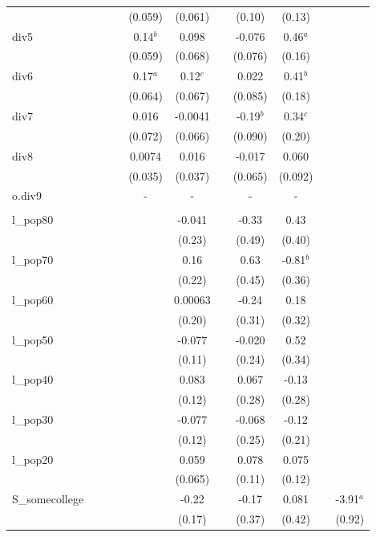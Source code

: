 \documentclass[]{article}
\begin{document}
\begin{tabular}{lcccccccccc}
 &  &  &  & (0.059) & (0.061) &  & (0.10) & (0.13) &  &  \\
div5 &  &  &  & 0.14$^b$ & 0.098 &  & -0.076 & 0.46$^a$ &  &  \\
 &  &  &  & (0.059) & (0.068) &  & (0.076) & (0.16) &  &  \\
div6 &  &  &  & 0.17$^a$ & 0.12$^c$ &  & 0.022 & 0.41$^b$ &  &  \\
 &  &  &  & (0.064) & (0.067) &  & (0.085) & (0.18) &  &  \\
div7 &  &  &  & 0.016 & -0.0041 &  & -0.19$^b$ & 0.34$^c$ &  &  \\
 &  &  &  & (0.072) & (0.066) &  & (0.090) & (0.20) &  &  \\
div8 &  &  &  & 0.0074 & 0.016 &  & -0.017 & 0.060 &  &  \\
 &  &  &  & (0.035) & (0.037) &  & (0.065) & (0.092) &  &  \\
o.div9 &  &  &  & - & - &  & - & - &  &  \\
 &  &  &  &  &  &  &  &  &  &  \\
l\_pop80 &  &  &  &  & -0.041 &  & -0.33 & 0.43 &  &  \\
 &  &  &  &  & (0.23) &  & (0.49) & (0.40) &  &  \\
l\_pop70 &  &  &  &  & 0.16 &  & 0.63 & -0.81$^b$ &  &  \\
 &  &  &  &  & (0.22) &  & (0.45) & (0.36) &  &  \\
l\_pop60 &  &  &  &  & 0.00063 &  & -0.24 & 0.18 &  &  \\
 &  &  &  &  & (0.20) &  & (0.31) & (0.32) &  &  \\
l\_pop50 &  &  &  &  & -0.077 &  & -0.020 & 0.52 &  &  \\
 &  &  &  &  & (0.11) &  & (0.24) & (0.34) &  &  \\
l\_pop40 &  &  &  &  & 0.083 &  & 0.067 & -0.13 &  &  \\
 &  &  &  &  & (0.12) &  & (0.28) & (0.28) &  &  \\
l\_pop30 &  &  &  &  & -0.077 &  & -0.068 & -0.12 &  &  \\
 &  &  &  &  & (0.12) &  & (0.25) & (0.21) &  &  \\
l\_pop20 &  &  &  &  & 0.059 &  & 0.078 & 0.075 &  &  \\
 &  &  &  &  & (0.065) &  & (0.11) & (0.12) &  &  \\
S\_somecollege &  &  &  &  & -0.22 &  & -0.17 & 0.081 &  & -3.91$^a$ \\
 &  &  &  &  & (0.17) &  & (0.37) & (0.42) &  & (0.92) \\

\end{tabular}
\end{document}
